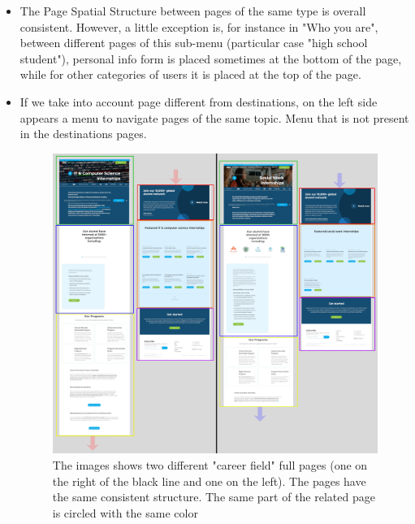 \documentclass[11pt, letterpaper]{article}
\begin{document}
\begin{enumerate}
\begin{itemize}
                \item The Page Spatial Structure between pages of the same type is overall consistent. However, a little exception is, for instance in "Who you are", between different pages of this sub-menu (particular case "high school student"), personal info form is placed sometimes at the bottom of the page, while for other categories of users it is placed at the top of the page.
                \item If we take into account page different from destinations, on the left side appears a menu to navigate pages of the same topic. Menu that is not present in the destinations pages.
                \begin{figure}[H]
                    \centering
                    \includegraphics[width=12cm]{images/inspection/MP5.png}
                    \caption{The images shows two different "career field" full pages (one on the right of the black line and one on the left). The pages have the same consistent structure. The same part of the related page is circled with the same color}
                \end{figure}
            \end{itemize}     
\end{enumerate} 
\end{document}
